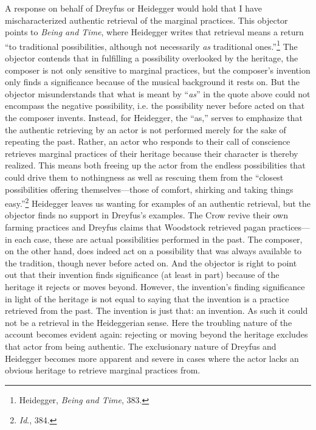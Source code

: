 A response on behalf of Dreyfus or Heidegger would hold that I have
mischaracterized authentic retrieval of the marginal practices. This
objector points to \emph{Being and Time}, where Heidegger writes that
retrieval means a return ``to traditional possibilities, although not
necessarily \emph{as} traditional ones.''\footnote{Heidegger,
  \emph{Being and Time}, 383.} The objector contends that in fulfilling
a possibility overlooked by the heritage, the composer is not only
sensitive to marginal practices, but the composer's invention only finds
a significance because of the musical background it rests on. But the
objector misunderstands that what is meant by ``\emph{as}'' in the quote
above could not encompass the negative possibility, i.e. the possibility
never before acted on that the composer invents. Instead, for Heidegger,
the ``as,'' serves to emphasize that the authentic retrieving by an
actor is not performed merely for the sake of repeating the past.
Rather, an actor who responds to their call of conscience retrieves
marginal practices of their heritage because their character is thereby
realized. This means both freeing up the actor from the endless
possibilities that could drive them to nothingness as well as rescuing
them from the ``closest possibilities offering themselves---those of
comfort, shirking and taking things easy.''\footnote{\emph{Id}., 384.}
Heidegger leaves us wanting for examples of an authentic retrieval, but
the objector finds no support in Dreyfus's examples. The Crow revive
their own farming practices and Dreyfus claims that Woodstock retrieved
pagan practices---in each case, these are actual possibilities performed
in the past. The composer, on the other hand, does indeed act on a
possibility that was always available to the tradition, though never
before acted on. And the objector is right to point out that their
invention finds significance (at least in part) because of the heritage
it rejects or moves beyond. However, the invention's finding
significance in light of the heritage is not equal to saying that the
invention is a practice retrieved from the past. The invention is just
that: an invention. As such it could not be a retrieval in the
Heideggerian sense. Here the troubling nature of the account becomes
evident again: rejecting or moving beyond the heritage excludes that
actor from being authentic. The exclusionary nature of Dreyfus and
Heidegger becomes more apparent and severe in cases where the actor
lacks an obvious heritage to retrieve marginal practices from.

